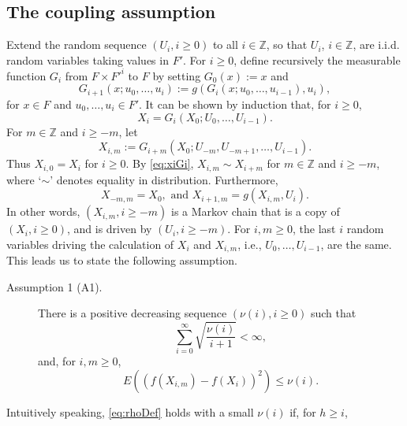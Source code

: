 \documentclass[a4paper,11pt]{article}
\begin{document}
 \subsection{The coupling assumption}\label{sub:coupling}
Extend the  random sequence \((U_{i}, i\ge0)\) to all   \(i\in\mathbb{Z}\), so that  \(U_{i}\), \(i\in\mathbb{Z}\),  are i.i.d. random variables taking values in \(F'\).  For \(i\geq0\),  define recursively the measurable function  \(G_{i}\)  from \({ F\times F'}^{i}\) to \(F\)  by setting \(G_{0}(x):=x\) and\begin{equation*}
G_{i+1}(x;u_{0},\dots,u_{i}):=g(G_{i}(x;u_{0},\dots,u_{i-1}),u_{i}),
\end{equation*}for \(x\in F\) and \(u_{0},\dots,u_{i}\in F'\). It can be shown by  induction that,  for \(i\geq0\), \begin{equation}\label{eq:xiGi}
X_{i}=G_{i}(X_{0};U_{0},\dots,U_{i-1}).
\end{equation}  For \(m\in\mathbb{Z}\) and \(i\geq-m\), let
\begin{equation}\label{XimDefinition}
X_{i,m}:=G_{i+m}(X_{0};U_{-m},U_{-m+1},\dots,U_{i-1}).
\end{equation}   
Thus     \(X_{i,0}=X_{i}\) for \(i\geq0\). By \eqref{eq:xiGi},    \(X_{i,m}\sim X_{i+m}\) for \(m\in\mathbb{Z}\) and \(i\geq-m\), where `\(\sim\)' denotes equality in distribution. Furthermore,\begin{equation}\label{eq:recXim}
X_{-m,m}=X_{0},\text{ and } X_{i+1,m}=g(X_{i,m},U_{i}).
\end{equation} In other words,  \((X_{i,m}, i\geq -m)\) is a Markov chain that is a copy of    \((X_{i}, i\geq 0)\),  and is driven by  \((U_{i}, i\geq -m)\).  For \(i,m\geq0\), the last \(i\) random variables  driving the calculation of \(X_{i}\) and \(X_{i,m}\), i.e., \(U_{0},\dots,U_{i-1}\), are the same. This leads us to state the following assumption.
\begin{description}
\item[Assumption 1 (A1).]    There is a positive decreasing sequence \((\nu(i),i\geq0)\)  such that
\begin{equation}\label{eq:infiniteSumAssumption}
\sum^{\infty}_{i=0}\sqrt{\frac{\nu(i)}{i+1}}<\infty,
\end{equation}and, for \(i,m\geq0\),\begin{equation}\label{eq:rhoDef}
E((f(X_{i,m})-f(X_{i}))^{2})\leq\nu(i).
\end{equation}
\end{description}
Intuitively speaking, \eqref{eq:rhoDef} holds with a small \(\nu(i)\) if, for \(h\geq i\),
\end{document}
